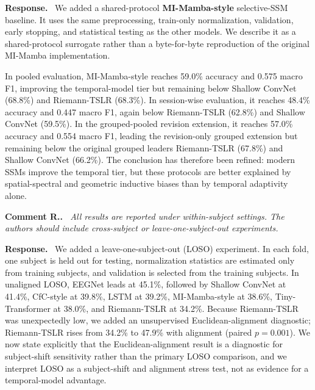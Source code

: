 \documentclass[11pt]{article}
\newcounter{reviewer}
\newcounter{point}[reviewer]
\renewcommand{\thepoint}{\thereviewer.\arabic{point}}
\newenvironment{reviewercomment}
  {\refstepcounter{point}\medskip\noindent\textbf{Comment R\thepoint.}\itshape\ }
  {\par}
\newenvironment{response}
  {\medskip\noindent\textbf{Response.}\ }
  {\par\medskip}
\begin{document}
\begin{response}
We added a shared-protocol \textbf{MI-Mamba-style} selective-SSM baseline. It uses the same preprocessing, train-only normalization, validation, early stopping, and statistical testing as the other models. We describe it as a shared-protocol surrogate rather than a byte-for-byte reproduction of the original MI-Mamba implementation.

In pooled evaluation, MI-Mamba-style reaches 59.0\% accuracy and 0.575 macro F1, improving the temporal-model tier but remaining below Shallow ConvNet (68.8\%) and Riemann-TSLR (68.3\%). In session-wise evaluation, it reaches 48.4\% accuracy and 0.447 macro F1, again below Riemann-TSLR (62.8\%) and Shallow ConvNet (59.5\%). In the grouped-pooled revision extension, it reaches 57.0\% accuracy and 0.554 macro F1, leading the revision-only grouped extension but remaining below the original grouped leaders Riemann-TSLR (67.8\%) and Shallow ConvNet (66.2\%). The conclusion has therefore been refined: modern SSMs improve the temporal tier, but these protocols are better explained by spatial-spectral and geometric inductive biases than by temporal adaptivity alone.
\end{response}

\begin{reviewercomment}
All results are reported under within-subject settings. The authors should include cross-subject or leave-one-subject-out experiments.
\end{reviewercomment}

\begin{response}
We added a leave-one-subject-out (LOSO) experiment. In each fold, one subject is held out for testing, normalization statistics are estimated only from training subjects, and validation is selected from the training subjects. In unaligned LOSO, EEGNet leads at 45.1\%, followed by Shallow ConvNet at 41.4\%, CfC-style at 39.8\%, LSTM at 39.2\%, MI-Mamba-style at 38.6\%, Tiny-Transformer at 38.0\%, and Riemann-TSLR at 34.2\%. Because Riemann-TSLR was unexpectedly low, we added an unsupervised Euclidean-alignment diagnostic; Riemann-TSLR rises from 34.2\% to 47.9\% with alignment (paired $p=0.001$). We now state explicitly that the Euclidean-alignment result is a diagnostic for subject-shift sensitivity rather than the primary LOSO comparison, and we interpret LOSO as a subject-shift and alignment stress test, not as evidence for a temporal-model advantage.
\end{response}
\end{document}

